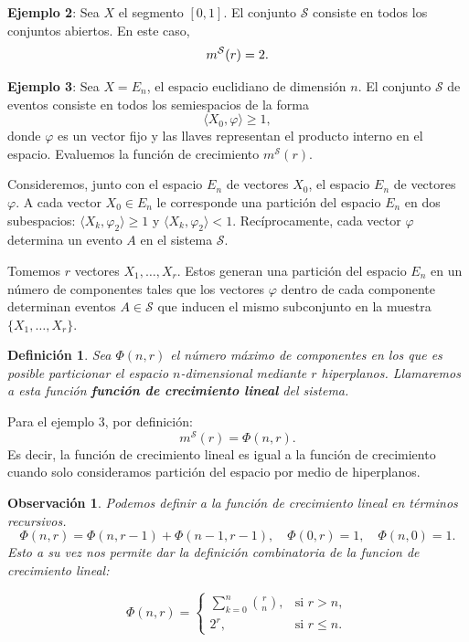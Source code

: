 \documentclass{report}
\newtheorem{dfn}{Definición}[section]
\newtheorem{obs}{Observación}[section]
\begin{document}
\textbf{Ejemplo 2}: Sea \( X \) el segmento \([0,1]\). El conjunto \( \mathcal{S} \) 
consiste en todos los conjuntos abiertos. En este caso,  
\[
m^{\mathcal{S}}(r) = 2.\newline
\]

\textbf{Ejemplo 3}: Sea \( X = E_n \), el espacio euclidiano de dimensión \( n \). 
El conjunto \( \mathcal{S} \) de eventos consiste en todos los semiespacios de la forma  
\[
\langle X_0, \varphi \rangle \geq 1,
\]  
donde \( \varphi \) es un vector fijo y las llaves representan el producto interno en el espacio.
 Evaluemos la función de crecimiento \( m^{\mathcal{S}}(r) \).\newline

Consideremos, junto con el espacio \( E_n \) de vectores \( X_0 \), el espacio \( E_n \) 
de vectores \( \varphi \). A cada vector \( X_0 \in E_n \) le corresponde una partición 
del espacio \( E_n \) en dos subespacios: \(\langle X_k, \varphi_2 \rangle \geq 1\) y \(\langle X_k, \varphi_2 \rangle < 1\). 
Recíprocamente, cada vector \(\varphi\) determina un evento $A$ en el sistema \(\mathcal{S}\).\newline

Tomemos \( r \) vectores \( X_1, \dots, X_r \). Estos generan una partición del espacio \( E_n \) 
en un número de componentes tales que los vectores \( \varphi \) dentro de cada componente determinan eventos 
\( A \in \mathcal{S} \) que inducen el mismo subconjunto en la muestra \( \{X_1, \dots, X_r \}\).\newline

\begin{dfn}
    Sea \( \Phi(n, r) \) el número máximo de componentes en los que es posible particionar el espacio \( n \)-dimensional 
mediante \( r \) hiperplanos. Llamaremos a esta función \textbf{función de crecimiento lineal} del sistema.
\end{dfn}


Para el ejemplo 3, por definición:
\[
    m^{\mathcal{S}}(r) = \Phi(n, r).
\]
Es decir, la función de crecimiento lineal es igual a la función de crecimiento cuando solo consideramos partición
del espacio por medio de hiperplanos.

\begin{obs}
Podemos definir a la función de crecimiento lineal en términos recursivos. 
\[
    \Phi(n, r) = \Phi(n, r - 1) + \Phi(n - 1, r - 1),\quad \Phi(0, r) = 1, \quad \Phi(n, 0) = 1.
\]
Esto a su vez nos permite dar la definición combinatoria de la funcion de crecimiento lineal:

\begin{equation}
\Phi(n, r) =
\begin{cases}
\sum\limits_{k=0}^{n} \binom{r}{n}, & \text{si } r > n, \\
2^r, & \text{si } r \leq n.
\end{cases}
\label{def: combinatoria función crecimiento lineal}
\end{equation}
\end{obs}
\end{document}
